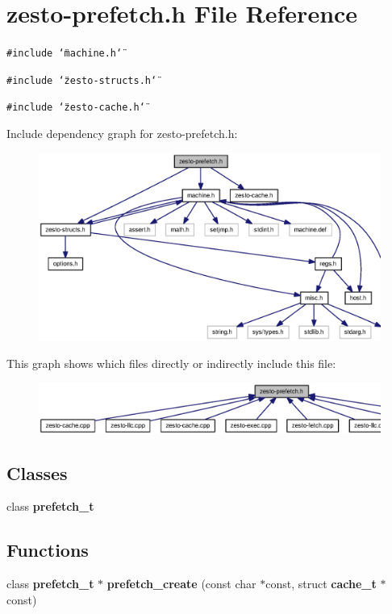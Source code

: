 \section{zesto-prefetch.h File Reference}
\label{zesto-prefetch_8h}
{\tt \#include \char`\"{}machine.h\char`\"{}}\par
{\tt \#include \char`\"{}zesto-structs.h\char`\"{}}\par
{\tt \#include \char`\"{}zesto-cache.h\char`\"{}}\par


Include dependency graph for zesto-prefetch.h:\nopagebreak
\begin{figure}[H]
\begin{center}
\leavevmode
\includegraphics[width=322pt]{zesto-prefetch_8h__incl}
\end{center}
\end{figure}


This graph shows which files directly or indirectly include this file:\nopagebreak
\begin{figure}[H]
\begin{center}
\leavevmode
\includegraphics[width=420pt]{zesto-prefetch_8h__dep__incl}
\end{center}
\end{figure}
\subsection*{Classes}
\begin{CompactItemize}
\item 
class {\bf prefetch\_\-t}
\end{CompactItemize}
\subsection*{Functions}
\begin{CompactItemize}
\item 
class {\bf prefetch\_\-t} $\ast$ {\bf prefetch\_\-create} (const char $\ast$const, struct {\bf cache\_\-t} $\ast$const)
\end{CompactItemize}


